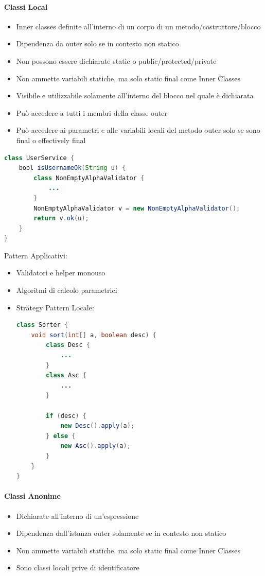 \documentclass[12pt]{extarticle}
\begin{document}
\paragraph{Classi Local}
\begin{itemize}
    \item Inner classes definite all'interno di un corpo di un metodo/costruttore/blocco
    \item Dipendenza da outer solo se in contesto non statico
    \item Non possono essere dichiarate static o public/protected/private
    \item Non ammette variabili statiche, ma solo static final come Inner Classes
    \item Visibile e utilizzabile solamente all'interno del blocco nel quale è dichiarata
    \item Può accedere a tutti i membri della classe outer
    \item Può accedere ai parametri e alle variabili locali del metodo outer solo se sono final o effectively final
\end{itemize}

\begin{lstlisting}[language=Java]
class UserService {
    bool isUsernameOk(String u) {
        class NonEmptyAlphaValidator {
            ...
        }
        NonEmptyAlphaValidator v = new NonEmptyAlphaValidator();
        return v.ok(u);
    }
}
\end{lstlisting}

\noindent Pattern Applicativi:
\begin{itemize}
    \item Validatori e helper monouso
    \item Algoritmi di calcolo parametrici
    \item Strategy Pattern Locale:
\begin{lstlisting}[language=Java]
class Sorter {
    void sort(int[] a, boolean desc) {
        class Desc {
            ...
        }
        class Asc {
            ...
        }

        if (desc) {
            new Desc().apply(a);
        } else {
            new Asc().apply(a);
        }
    }
}
\end{lstlisting}
\end{itemize}

\paragraph{Classi Anonime}
\begin{itemize}
    \item Dichiarate all'interno di un'espressione
    \item Dipendenza dall'istanza outer solamente se in contesto non statico
    \item Non ammette variabili statiche, ma solo static final come Inner Classes
    \item Sono classi locali prive di identificatore
\end{itemize}
\end{document}
